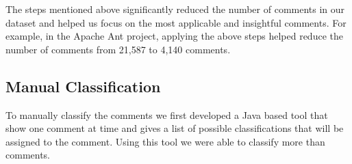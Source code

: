 The steps mentioned above significantly reduced the number of comments in our dataset and helped us focus on the most applicable and insightful comments. For example, in the Apache Ant project, applying the above steps helped reduce the number of comments from 21,587 to 4,140 comments.


\subsection{Manual Classification} %
\label{sub:manual_classification}

To manually classify the comments we first developed a Java based tool that show one comment at time and gives a list of possible classifications that will be assigned to the comment. Using this tool we were able to classify more than  comments. 

